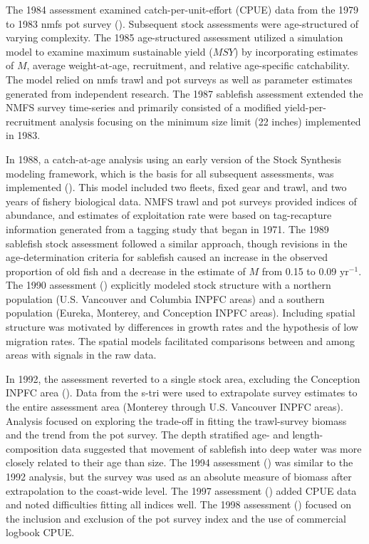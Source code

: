 \documentclass[
  english,
]{article}
\begin{document}
The 1984 assessment examined catch-per-unit-effort (CPUE) data from the
1979 to 1983 \gls{nmfs} pot survey
(). Subsequent stock
assessments were age-structured of varying complexity. The 1985
age-structured assessment utilized a simulation model to examine maximum
sustainable yield (\(MSY\)) by incorporating estimates of \(M\), average
weight-at-age, recruitment, and relative age-specific catchability. The
model relied on \gls{nmfs} trawl and pot surveys as well as parameter
estimates generated from independent research. The 1987 sablefish
assessment extended the NMFS survey time-series and primarily consisted
of a modified yield-per-recruitment analysis focusing on the minimum
size limit (22 inches) implemented in 1983.

In 1988, a catch-at-age analysis using an early version of the Stock
Synthesis modeling framework, which is the basis for all subsequent
assessments, was implemented (). This model included two fleets, fixed gear and
trawl, and two years of fishery biological data. NMFS trawl and pot
surveys provided indices of abundance, and estimates of exploitation
rate were based on tag-recapture information generated from a tagging
study that began in 1971. The 1989 sablefish stock assessment followed a
similar approach, though revisions in the age-determination criteria for
sablefish caused an increase in the observed proportion of old fish and
a decrease in the estimate of \(M\) from 0.15 to 0.09 yr\(^{-1}\). The
1990 assessment () explicitly modeled stock structure with a northern population
(U.S. Vancouver and Columbia INPFC areas) and a southern population
(Eureka, Monterey, and Conception INPFC areas). Including spatial
structure was motivated by differences in growth rates and the
hypothesis of low migration rates. The spatial models facilitated
comparisons between and among areas with signals in the raw data.

In 1992, the assessment reverted to a single stock area, excluding the
Conception INPFC area (). Data
from the \gls{s-tri} were used to extrapolate survey estimates to the
entire assessment area (Monterey through U.S. Vancouver INPFC areas).
Analysis focused on exploring the trade-off in fitting the trawl-survey
biomass and the trend from the pot survey. The depth stratified age- and
length-composition data suggested that movement of sablefish into deep
water was more closely related to their age than size. The 1994
assessment () was similar to the
1992 analysis, but the survey was used as an absolute measure of biomass
after extrapolation to the coast-wide level. The 1997 assessment
() added CPUE data
and noted difficulties fitting all indices well. The 1998 assessment
() focused on the
inclusion and exclusion of the pot survey index and the use of
commercial logbook CPUE.
\end{document}
